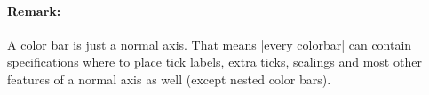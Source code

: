{{		\paragraph{Remark:}
		A
		color
		bar
		is
		just
		a
		normal
		axis.
		That
		means
		|every
		colorbar|
		can
		contain
		specifications
		where
		to
		place
		tick
		labels,
		extra
		ticks,
		scalings
		and
		most
		other
		features
		of
		a
		normal
		axis
		as
		well
		(except
		nested
		color
		bars).
	}\loadedtable

	\ttfamily
	\pgfplotstablesort[sort cmp={string <}]\loadedtable\loadedtable
	

	\onecolumn


	\pgfplotstabletypeset[column type=l,begin table=\begin{longtable},end table=\end{longtable},verb string type]\loadedtable

	\twocolumn
}
